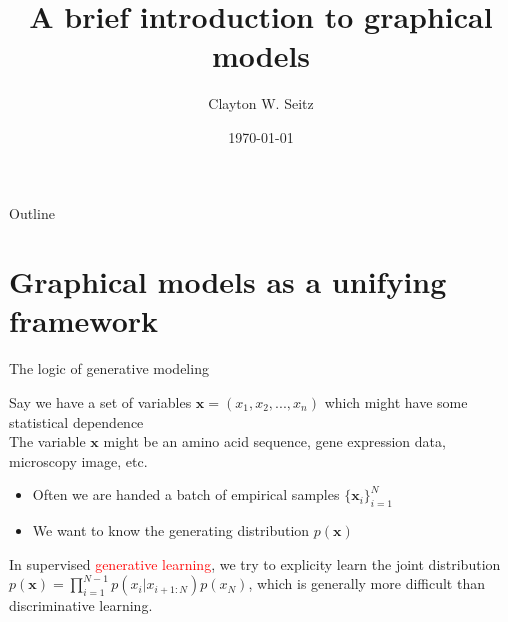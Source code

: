 \documentclass{beamer}					%
\title{A brief introduction to graphical models}	%
\author{Clayton W. Seitz}								%
\date{\today}									%
\begin{document}
\begin{frame}
  \titlepage
\end{frame}

\begin{frame}{Outline}
  \tableofcontents
\end{frame}

%


\section{Graphical models as a unifying framework}

\begin{frame}{The logic of generative modeling}

Say we have a set of variables $\mathbf{x} = (x_{1},x_{2},...,x_{n})$ which might have some statistical dependence\\
\vspace{0.1in}
The variable $\mathbf{x}$ might be an amino acid sequence, gene expression data, microscopy image, etc.\\
\vspace{0.1in}
\begin{itemize}
\item Often we are handed a batch of empirical samples $\{\mathbf{x}_{i}\}_{i=1}^{N}$
\item We want to know the generating distribution $p(\mathbf{x})$
\end{itemize}

In supervised \textcolor{red}{generative learning}, we try to explicity learn the joint distribution $p(\mathbf{x}) = \prod_{i=1}^{N-1}p(x_{i}|x_{i+1:N})p(x_{N})$, which is generally more difficult than discriminative learning. 

\end{frame}
\end{document}
